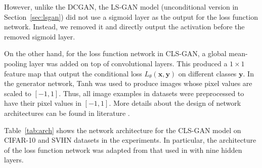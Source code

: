 However, unlike the DCGAN, the LS-GAN model (unconditional version in Section~\ref{sec:lsgan}) did not use a sigmoid layer as the output for the loss function network.  Instead, we removed it and directly output the activation before the removed sigmoid layer.


On the other hand, for the loss function network in CLS-GAN, a global mean-pooling layer was added on top of convolutional layers.  This produced a $1\times 1$ feature map that output the conditional loss $L_\theta(\mathbf x, \mathbf y)$ on different classes $\mathbf y$.
In the generator network, Tanh was used to produce images whose pixel values are scaled to $[-1,1]$. Thus, all image examples in datasets were preprocessed to have their pixel values in $[-1,1]$.
More details about the design of network architectures can be found in literature \cite{radford2015unsupervised}.

Table~\ref{tab:arch} shows the network architecture for the CLS-GAN model on CIFAR-10 and SVHN datasets in the experiments.  In particular, the architecture of the loss function network was adapted from that used in \cite{springenberg2015unsupervised} with nine hidden layers.



